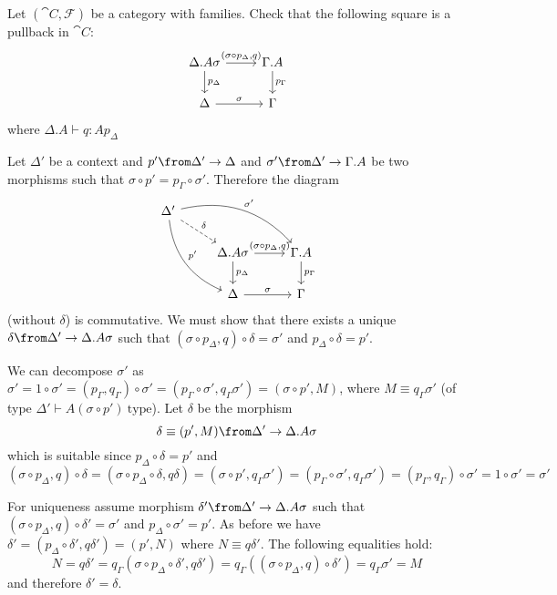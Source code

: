 \begin{exercise}
  Let $(\cat C, \mathcal F)$ be a category with families.  Check that the
  following square is a pullback in $\cat{C}$:
  \[
    \begin{tikzcd}
      \Delta.A\sigma \arrow{r}{(\sigma \circ p_\Delta, q)} \arrow{d}{p_\Delta} & \Gamma.A \arrow{d}{p_\Gamma}\\
      \Delta \arrow{r}{\sigma} & \Gamma
    \end{tikzcd}
  \]
  where $\Delta.A \vdash q : A p_\Delta$
\end{exercise}
\begin{answer}
  Let $\Delta'$ be a context and $p' \from \Delta' \to \Delta$ and $\sigma'
  \from \Delta' \to \Gamma.A$ be two morphisms such that $\sigma \circ p' =
  p_\Gamma \circ \sigma'$. Therefore the diagram
  \[
    \begin{tikzcd}
      \Delta' \arrow[bend right=30]{ddr}{p'} \arrow[dashed]{dr}{\delta} \arrow[bend left=30]{drr}{\sigma'}&   &\\
          & \Delta.A\sigma \arrow{r}{(\sigma \circ p_\Delta, q)} \arrow{d}{p_\Delta} & \Gamma.A \arrow{d}{p_\Gamma}\\
          & \Delta \arrow{r}{\sigma} & \Gamma
    \end{tikzcd}
  \]
  (without $\delta$) is commutative. We must show that there exists a unique
  $\delta \from \Delta' \to \Delta.A\sigma$ such that $(\sigma \circ p_\Delta,
  q) \circ \delta = \sigma'$ and $p_\Delta \circ \delta = p'$.

  We can decompose $\sigma'$ as $\sigma' = 1 \circ \sigma' = (p_\Gamma,
  q_\Gamma) \circ \sigma' = (p_\Gamma \circ \sigma', q_\Gamma\sigma') = (\sigma
  \circ p', M)$, where $M \equiv q_\Gamma\sigma'$ (of type $\Delta' \vdash
  A(\sigma \circ p') ~\text{type}$). Let $\delta$ be the morphism
  \[
    \delta \equiv (p', M) \from \Delta' \to \Delta.A\sigma
  \]
  which is suitable since $p_\Delta \circ \delta = p'$ and
  \[
    (\sigma \circ p_\Delta, q) \circ \delta =
    (\sigma \circ p_\Delta \circ \delta, q\delta) =
    (\sigma \circ p', q_\Gamma\sigma') =
    (p_\Gamma \circ \sigma', q_\Gamma\sigma') =
    (p_\Gamma, q_\Gamma) \circ \sigma' =
    1 \circ \sigma' =
    \sigma'
  \]

  For uniqueness assume morphism $\delta' \from \Delta' \to \Delta.A\sigma$
  such that $(\sigma \circ p_\Delta, q) \circ \delta' = \sigma'$ and $p_\Delta
  \circ \sigma' = p'$. As before we have $\delta' = (p_\Delta \circ \delta',
  q\delta') = (p', N)$ where $N \equiv q\delta'$. The following equalities
  hold:
  \[
    N = q\delta' = q_\Gamma(\sigma \circ p_\Delta \circ \delta', q\delta') = q_\Gamma((\sigma \circ p_\Delta, q) \circ \delta') = q_\Gamma\sigma' = M
  \]
  and therefore $\delta' = \delta$.
\end{answer}

